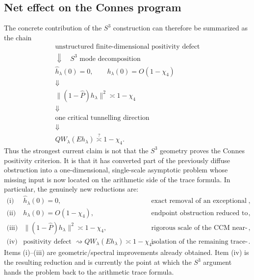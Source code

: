 \subsection{Net effect on the Connes program}
The concrete contribution of the \(S^3\) construction can therefore be
summarized as the chain
\[
\boxed{
\begin{array}{c}
\text{unstructured finite-dimensional positivity defect}
\\[2mm]
\Downarrow\quad S^3\text{ mode decomposition}
\\[2mm]
\widehat h_\lambda(0)=0,
\qquad
h_\lambda(0)=O(1-\chi_4)
\\[2mm]
\Downarrow
\\[2mm]
\|(1-\widehat P)h_\lambda\|^2
   \asymp1-\chi_4
\\[2mm]
\Downarrow
\\[2mm]
\text{one critical tunnelling direction}
\\[2mm]
\Downarrow
\\[2mm]
QW_\lambda(Eh_\lambda)
   \stackrel{?}{\asymp}1-\chi_4 .
\end{array}}
\]
Thus the strongest current claim is not that the \(S^3\) geometry proves the
Connes positivity criterion.  It is that it has converted part of the
previously diffuse obstruction into a one-dimensional, single-scale
asymptotic problem whose missing input is now located on the arithmetic side
of the trace formula.
In particular, the genuinely new reductions are:
\[
\begin{array}{lll}
\text{(i)}&
\widehat h_\lambda(0)=0,
&
\text{exact removal of an exceptional scalar mode},
\\[1mm]
\text{(ii)}&
h_\lambda(0)=O(1-\chi_4),
&
\text{endpoint obstruction reduced to tunnelling scale},
\\[1mm]
\text{(iii)}&
\|(1-\widehat P)h_\lambda\|^2\asymp1-\chi_4,
&
\text{rigorous scale of the CCM near-null direction},
\\[1mm]
\text{(iv)}&
\text{positivity defect }\rightsquigarrow
QW_\lambda(Eh_\lambda)\asymp1-\chi_4,
&
\text{isolation of the remaining trace-formula lemma}.
\end{array}
\]
Items (i)--(iii) are geometric/spectral improvements already obtained.
Item (iv) is the resulting reduction and is currently the point at which the
\(S^3\) argument hands the problem back to the arithmetic trace formula.
